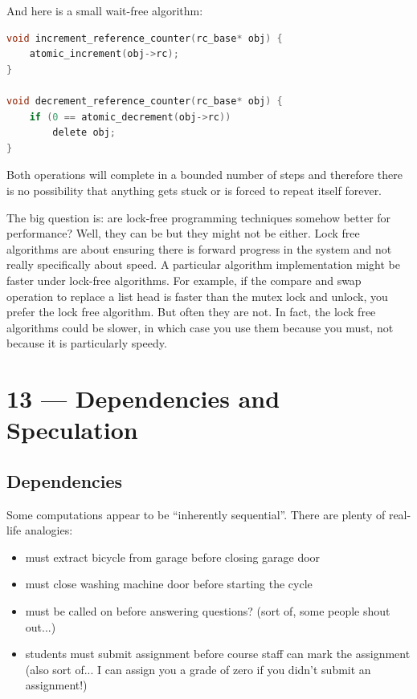 \documentclass[a4paper]{report}
\begin{document}
And here is a small wait-free algorithm:

\begin{lstlisting}[language=C]
void increment_reference_counter(rc_base* obj) {
    atomic_increment(obj->rc);
}

void decrement_reference_counter(rc_base* obj) {
    if (0 == atomic_decrement(obj->rc))
        delete obj;
} 
\end{lstlisting}

Both operations will complete in a bounded number of steps and therefore there is no possibility that anything gets stuck or is forced to repeat itself forever. 

The big question is: are lock-free programming techniques somehow better for performance? Well, they can be but they might not be either. Lock free algorithms are about ensuring there is forward progress in the system and not really specifically about speed. A particular algorithm implementation might be faster under lock-free algorithms. For example, if the compare and swap operation to replace a list head is faster than the mutex lock and unlock, you prefer the lock free algorithm. But often they are not. In fact, the lock free algorithms could be slower, in which case you use them because you must, not because it is particularly speedy.









\chapter*{13 --- Dependencies and Speculation}


\section*{Dependencies}
Some computations appear to be ``inherently sequential''. There are plenty of real-life analogies:

\begin{itemize}
\item must extract bicycle from garage before closing garage door
 
\item must close washing machine door before starting the cycle
 
\item must be called on before answering questions? (sort of, some people shout out...)
 
\item students must submit assignment before course staff can mark the assignment (also sort of... I can assign you a grade of zero if you didn't submit an assignment!)
\end{itemize}
\end{document}
